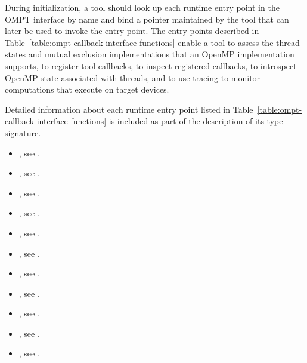 During initialization, a tool should look up each runtime entry point in the
OMPT interface by name and bind a pointer maintained by the tool that can later
be used to invoke the entry point. The entry points described in 
Table~\ref{table:ompt-callback-interface-functions} enable a tool to assess
the thread states and mutual exclusion implementations that an OpenMP
implementation supports, to register tool callbacks, to inspect registered 
callbacks, to introspect OpenMP state associated with threads, and to use 
tracing to monitor computations that execute on target devices.

Detailed information about each runtime entry point listed in
Table~\ref{table:ompt-callback-interface-functions} is included as
part of the description of its type signature.

\crossreferences
\begin{itemize}
\item {}, see .

\item {}, 
see  .

\item {}, see .

\item {}, see .

\item {}, see .

\item {}, see .

\item {}, see .

\item {}, see .

\item {}, see .

\item {}, 
see .

\item {}, see .


\end{itemize}
